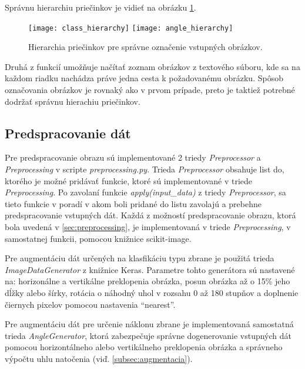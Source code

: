 Správnu hierarchiu priečinkov je vidieť na obrázku \ref{pic:folderhierarchy}.

\begin{figure}[H]
    \centering
    \texttt{[image: class\_hierarchy]}
    \qquad
    \texttt{[image: angle\_hierarchy]}
    \caption{Hierarchia priečinkov pre správne označenie vstupných obrázkov.}
    \label{pic:folderhierarchy}
\end{figure}

Druhá z funkcií umožňuje načítať zoznam obrázkov z textového súboru, kde sa na každom riadku nachádza práve jedna cesta k požadovanému obrázku.
Spôsob označovania obrázkov je rovnaký ako v prvom prípade, preto je taktiež potrebné dodržať správnu hierachiu priečinkov.

\subsection{Predspracovanie dát}
\label{subsec:predspracovaniedat}
Pre predspracovanie obrazu sú implementované 2 triedy \textit{Preprocessor} a \textit{Preprocessing} v scripte \textit{preprocessing.py}.
Trieda \textit{Preprocessor} obsahuje list do, ktorého je možné pridávať funkcie, ktoré sú implementované v triede \textit{Preprocessing}.
Po zavolaní funkcie \textit{apply(input\_data)} z triedy \textit{Preprocessor}, sa tieto
    funkcie v poradí v akom boli pridané do listu zavolajú a prebehne predspracovanie vstupných dát.
Každá z možností predspracovanie obrazu, ktorá bola uvedená v \ref{sec:preprocessing}, je implementovaná v triede \textit{Preprocessing}, v samostatnej funkcii,
    pomocou knižnice scikit-image.

Pre augmentáciu dát určených na klasfikáciu typu zbrane je použitá trieda \textit{ImageDataGenerator} z knižnice Keras.
Parametre tohto generátora sú nastavené na: horizonálne a vertikálne preklopenia obrázka, posun obrázka až o 15\% jeho dĺžky alebo šírky,
    rotácia o náhodný uhol v rozsahu 0 až 180 stupňov a doplnenie čiernych pixelov pomocou nastavenia ``nearest''.

Pre augmentáciu dát pre určenie náklonu zbrane je implementovaná samostatná trieda \textit{AngleGenerator}, ktorá zabezpečuje správne dogenerovanie
    vstupných dát pomocou horizontálneho alebo vertikálneho preklopenia obrázka a správneho výpočtu uhlu natočenia (viď. \ref{subsec:augmentacia}).
